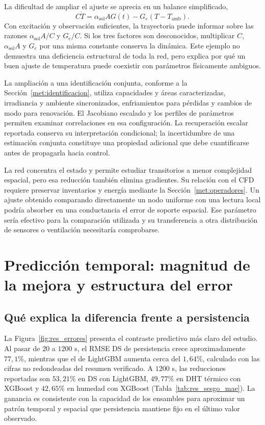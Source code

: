 La dificultad de ampliar el ajuste se aprecia en un balance simplificado,
\begin{equation}
C\dot T=\alpha_{\mathrm{sol}}AG(t)-G_e(T-T_{\mathrm{amb}}).
\label{eq:dis_identificabilidad}
\end{equation}
Con excitación y observación suficientes, la trayectoria puede informar sobre las razones $\alpha_{\mathrm{sol}}A/C$ y $G_e/C$. Si los tres factores son desconocidos, multiplicar $C$, $\alpha_{\mathrm{sol}}A$ y $G_e$ por una misma constante conserva la dinámica. Este ejemplo no demuestra una deficiencia estructural de toda la red, pero explica por qué un buen ajuste de temperatura puede coexistir con parámetros físicamente ambiguos.

La ampliación a una identificación conjunta, conforme a la Sección~\ref{met:identificacion}, utiliza capacidades y áreas caracterizadas, irradiancia y ambiente sincronizados, enfriamientos para pérdidas y cambios de modo para renovación. El Jacobiano escalado y los perfiles de parámetros permiten examinar correlaciones en esa configuración. La recuperación escalar reportada conserva su interpretación condicional; la incertidumbre de una estimación conjunta constituye una propiedad adicional que debe cuantificarse antes de propagarla hacia control.

La red concentra el estado y permite estudiar transitorios a menor complejidad espacial, pero esa reducción también elimina gradientes. Su relación con el CFD requiere preservar inventarios y energía mediante la Sección~\ref{met:operadores}. Un ajuste obtenido comparando directamente un nodo uniforme con una lectura local podría absorber en una conductancia el error de soporte espacial. Ese parámetro sería efectivo para la comparación utilizada y su transferencia a otra distribución de sensores o ventilación necesitaría comprobarse.
\FloatBarrier

\section{Predicción temporal: magnitud de la mejora y estructura del error}
\label{dis:prediccion}

\subsection{Qué explica la diferencia frente a persistencia}

La Figura~\ref{fig:res_errores} presenta el contraste predictivo más claro del estudio. Al pasar de $20$ a $1200$ s, el RMSE DS de persistencia crece aproximadamente $77{,}1\%$, mientras que el de LightGBM aumenta cerca del $1{,}64\%$, calculado con las cifras no redondeadas del resumen verificado. A $1200$ s, las reducciones reportadas son $53{,}21\%$ en DS con LightGBM, $49{,}77\%$ en DHT térmico con XGBoost y $42{,}65\%$ en humedad con XGBoost (Tabla~\ref{tab:res_sesgo_mae}). La ganancia es consistente con la capacidad de los ensambles para aproximar un patrón temporal y espacial que persistencia mantiene fijo en el último valor observado.

